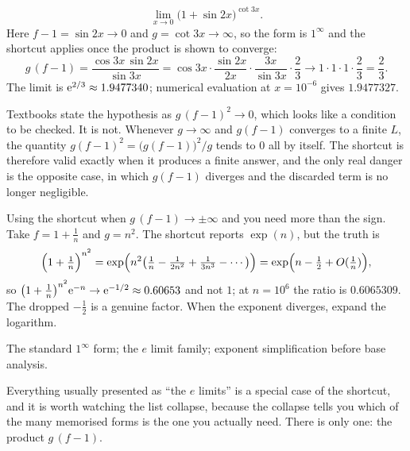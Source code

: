 \begin{worked}
\[\lim_{x\to0}\bigl(1+\sin2x\bigr)^{\cot3x}.\]
Here $f-1=\sin 2x\to0$ and $g=\cot 3x\to\infty$, so the form is $1^{\infty}$ and the shortcut applies once the product is shown to converge:
\[g\,(f-1)=\frac{\cos3x\,\sin2x}{\sin3x}=\cos 3x\cdot\frac{\sin2x}{2x}\cdot\frac{3x}{\sin3x}\cdot\frac{2}{3}\longrightarrow 1\cdot1\cdot1\cdot\frac23=\frac23 .\]
The limit is $\mathrm{e}^{2/3}\approx1.9477340$; numerical evaluation at $x=10^{-6}$ gives $1.9477327$.
\end{worked}

\begin{keynote}
Textbooks state the hypothesis as $g\,(f-1)^{2}\to0$, which looks like a condition to be checked. It is not. Whenever $g\to\infty$ and $g(f-1)$ converges to a finite $L$, the quantity $g(f-1)^{2}=\bigl(g(f-1)\bigr)^{2}/g$ tends to $0$ all by itself. The shortcut is therefore valid exactly when it produces a finite answer, and the only real danger is the opposite case, in which $g(f-1)$ diverges and the discarded term is no longer negligible.
\end{keynote}

\begin{trap}
Using the shortcut when $g\,(f-1)\to\pm\infty$ and you need more than the sign. Take $f=1+\tfrac1n$ and $g=n^{2}$. The shortcut reports $\exp(n)$, but the truth is
\[\Bigl(1+\tfrac1n\Bigr)^{n^{2}}=\exp\Bigl(n^{2}\bigl(\tfrac1n-\tfrac1{2n^{2}}+\tfrac{1}{3n^{3}}-\cdots\bigr)\Bigr)=\exp\Bigl(n-\tfrac12+O(\tfrac1n)\Bigr),\]
so $\bigl(1+\tfrac1n\bigr)^{n^{2}}\mathrm{e}^{-n}\to \mathrm{e}^{-1/2}\approx0.60653$ and not $1$; at $n=10^{6}$ the ratio is $0.6065309$. The dropped $-\tfrac12$ is a genuine factor. When the exponent diverges, expand the logarithm.
\end{trap}

\begin{seealsob}The standard $1^{\infty}$ form; the $e$ limit family; exponent simplification before base analysis.\end{seealsob}

Everything usually presented as ``the $e$ limits'' is a special case of the shortcut, and it is worth watching the list collapse, because the collapse tells you which of the many memorised forms is the one you actually need. There is only one: the product $g\,(f-1)$.

